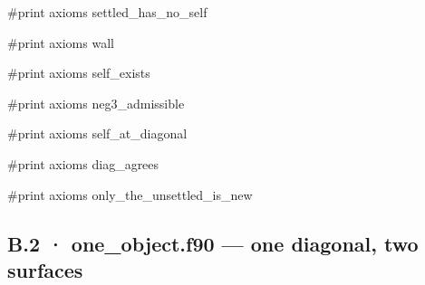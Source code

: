 \documentclass[10pt,twocolumn]{article}
\newenvironment{Shaded}{}{}
\newcommand{\NormalTok}[1]{#1}
\providecommand{\NormalTok}[1]{#1}
\providecommand{\NormalTok}[1]{#1}
\begin{document}
\begin{strip}
\begin{Shaded}
\begin{Highlighting}[]
\NormalTok{\#print axioms settled\_has\_no\_self}

\NormalTok{\#print axioms wall}

\NormalTok{\#print axioms self\_exists}

\NormalTok{\#print axioms neg3\_admissible}

\NormalTok{\#print axioms self\_at\_diagonal}

\NormalTok{\#print axioms diag\_agrees}

\NormalTok{\#print axioms only\_the\_unsettled\_is\_new}
\end{Highlighting}
\end{Shaded}
\end{strip}

\subsection{B.2 · one\_object.f90 --- one diagonal, two
surfaces}\label{b.2-one_object.f90-one-diagonal-two-surfaces}
\end{document}
